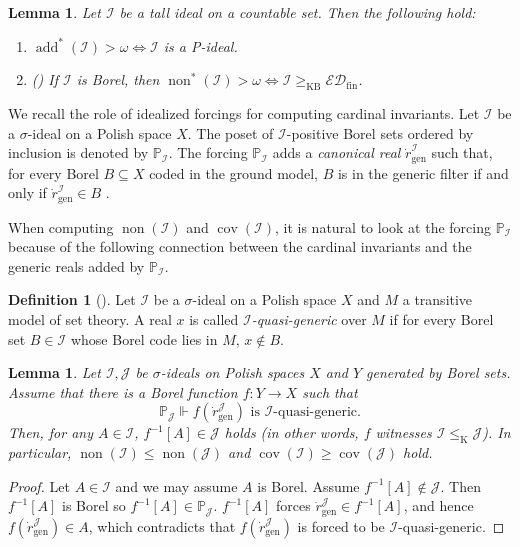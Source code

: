 \documentclass[a4paper,12pt]{amsart}
\newtheorem{lem}[thm]{Lemma}
\theoremstyle{definition}
\newtheorem{dfn}[thm]{Definition}
\numberwithin{thm}{section}
\numberwithin{equation}{section}
\DeclareMathOperator{\non}{non}
\DeclareMathOperator{\cov}{cov}
\DeclareMathOperator{\add}{add}
\newcommand{\I}{\mathscr{I}}
\newcommand{\edfin}{\mathcal{ED}_\mathrm{fin}}
\begin{document}
    \begin{lem}\label{lem:addstar_nonstar}
        Let $\I$ be a tall ideal on a countable set. Then the following hold:
        \begin{enumerate}
            \item $\add^*(\I) > \omega \iff \I$ is a P-ideal.
            \item \textnormal{(\cite{HMM10})} If $\I$ is Borel, then $\non^*(\I) > \omega \iff \I\geq_{\mathrm{KB}}\edfin$.
        \end{enumerate}
    \end{lem}

    We recall the role of idealized forcings for computing cardinal invariants. Let $\mathcal{I}$ be a $\sigma$-ideal on a Polish space $X$. The poset of $\mathcal{I}$-positive Borel sets ordered by inclusion is denoted by $\mathbb{P}_{\mathcal{I}}$. The forcing $\mathbb{P}_\mathcal{I}$ adds a \emph{canonical real} $\dot{r}^{\mathcal{I}}_{\text{gen}}$ such that, for every Borel $B \subseteq X$ coded in the ground model, $B$ is in the generic filter if and only if $\dot{r}^{\mathcal{I}}_{\text{gen}} \in B$ \cite[Proposition 2.1.2]{Zapl}. 
    
    When computing $\non(\mathcal{I})$ and $\cov(\mathcal{I})$, it is natural to look at the forcing $\mathbb{P}_\mathcal{I}$ because of the following connection between the cardinal invariants and the generic reals added by $\mathbb{P}_\mathcal{I}$.
    
    \begin{dfn}[{\cite[Definition 2.3.1]{Kho11}}]
        Let $\mathcal{I}$ be a $\sigma$-ideal on a Polish space $X$ and $M$ a transitive model of set theory. A real $x$ is called \emph{$\mathcal{I}$-quasi-generic} over $M$ if for every Borel set $B\in\mathcal{I}$ whose Borel code lies in $M$, $x\notin B$.
    \end{dfn}

    \begin{lem}\label{lem:quasi}
        Let $\mathcal{I}, \mathcal{J}$ be $\sigma$-ideals on Polish spaces $X$ and $Y$ generated by Borel sets. Assume that there is a Borel function $f\colon Y\to X$ such that
        \[
        \mathbb{P}_\mathcal{J}\Vdash f(\dot{r}^\mathcal{J}_\mathrm{gen})\text{ is }\mathcal{I}\text{-quasi-generic}.
        \]
        Then, for any $A\in\mathcal{I}$, $f^{-1}[A]\in\mathcal{J}$ holds (in other words, $f$ witnesses $\mathcal{I} \leq_{\mathrm{K}} \mathcal{J}$). In particular, $\non(\mathcal{I})\leq\non(\mathcal{J})$ and $\cov(\mathcal{I})\geq\cov(\mathcal{J})$ hold.
    \end{lem}
    \begin{proof}
        Let $A\in\mathcal{I}$ and we may assume $A$ is Borel. Assume $f^{-1}[A]\notin\mathcal{J}$. Then $f^{-1}[A]$ is Borel so $f^{-1}[A]\in \mathbb{P}_\mathcal{J}$. $f^{-1}[A]$ forces $\dot{r}^\mathcal{J}_\mathrm{gen}\in f^{-1}[A]$, and hence $ f(\dot{r}^\mathcal{J}_\mathrm{gen})\in A$, which contradicts that $f(\dot{r}^\mathcal{J}_\mathrm{gen})$ is forced to be $\mathcal{I}$-quasi-generic. 
    \end{proof}
\end{document}

